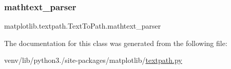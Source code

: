 \mbox{\label{classmatplotlib_1_1textpath_1_1TextToPath_a14eac8e49ef9555f674bc8442044f8ac}} 
\subsubsection{\texorpdfstring{mathtext\+\_\+parser}{mathtext\_parser}}
{\footnotesize\ttfamily matplotlib.\+textpath.\+Text\+To\+Path.\+mathtext\+\_\+parser}



The documentation for this class was generated from the following file\+:\begin{DoxyCompactItemize}
\item 
venv/lib/python3./site-\/packages/matplotlib/\hyperlink{textpath_8py}{textpath.\+py}\end{DoxyCompactItemize}
